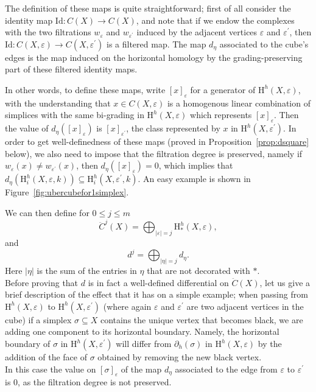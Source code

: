\documentclass[11pt, a4paper, reqno, twoside, makeidx]{amsart}
\theoremstyle{remark}
\theoremstyle{plain}
\theoremstyle{definition}
\newcommand{\HH}{\mathrm{H}}
\begin{document}
The definition of these maps is quite straightforward; first of all consider the identity map $\mathrm{Id} : C(X) \longrightarrow C(X)$, and note that if we endow the complexes with the two filtrations $w_\varepsilon$ and $w_{\varepsilon^\prime}$ induced by the adjacent vertices $\varepsilon$ and $\varepsilon^\prime$, then $\mathrm{Id} : C(X, \varepsilon) \longrightarrow C(X, \varepsilon^\prime)$ is a filtered map. The map $d_\eta$ associated to the cube's edges is the map induced on the horizontal homology by the grading-preserving part of these filtered identity maps.

In other words, to define these maps, write $[x]_\varepsilon$ for a generator of $\HH^h(X, \varepsilon)$, with the understanding that $x \in C(X, \varepsilon)$ is a homogenous linear combination of simplices with the same bi-grading in $\HH^h(X, \varepsilon)$ which represents $[x]_\varepsilon$. Then the value of $d_\eta ([x]_\varepsilon)$ is $[x]_{\varepsilon^\prime}$, the class represented by $x$ in $\HH^h(X, \varepsilon^\prime)$. In order to get well-definedness of these maps (proved in Proposition~\ref{prop:dsquare} below), we also need to impose that the filtration degree is preserved, namely if $w_\varepsilon (x) \neq w_{\varepsilon^\prime} (x)$, then $d_\eta ([x]_\varepsilon)=0$, which implies that $d_\eta (\HH^h_i(X, \varepsilon, k)) \subseteq \HH^h_i(X, \varepsilon^\prime, k) $.
An easy example is shown in Figure~\ref{fig:ubercubefor1simplex}.

We can then define for $0\le j\le m$ $$\ddot{C}^j(X) = \bigoplus_{|\varepsilon| = j} \HH_*^h(X,\varepsilon),$$
and $$d^j = \bigoplus_{|\eta| = j} d_\eta.$$
Here $|\eta|$ is the sum of the entries in $\eta$ that are not decorated with $*$.\\

Before proving that $d$ is in fact a well-defined differential on $\ddot{C}(X)$, let us give a brief description of the effect that it has on a simple example; when passing from $\HH^h(X, \varepsilon)$ to $\HH^h(X, \varepsilon^\prime)$ (where again $\varepsilon$ and $\varepsilon^\prime$ are two adjacent vertices in the cube) if a simplex $\sigma \subseteq X$ contains the unique vertex that becomes black, we are adding one component to its horizontal boundary. 
Namely, the horizontal boundary of $\sigma$ in $\HH^h(X, \varepsilon^\prime)$ will differ from $\partial_h (\sigma)$ in $\HH^h(X, \varepsilon)$ by the addition of the face of $\sigma$ obtained by removing the new black vertex. \\
In this case the value on $[\sigma]_\varepsilon$ of the map $d_\eta$ associated to the edge from $\varepsilon$ to $\varepsilon^\prime$ is $0$, as the filtration degree is not preserved. 
\end{document}
